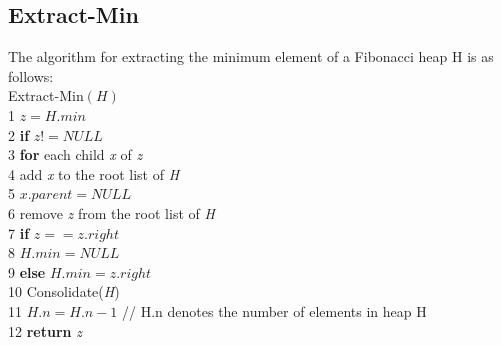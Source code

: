 \documentclass[12pt, a4paper]{article}
\begin{document}
	\subsection{Extract-Min}
	The algorithm for extracting the minimum element of a Fibonacci heap H is as follows: \\
	\large{Extract-Min$(H)$} \\
	1\-\hspace{0.5cm} $z = H.min$ \\
	2\-\hspace{0.5cm} \textbf{if} $z != NULL$\\
	3\-\hspace{0.5cm} \-\hspace{0.5cm} \textbf{for} each child \textit{x} of \textit{z} \\
	4\-\hspace{0.5cm} \-\hspace{0.5cm} \-\hspace{0.5cm} add \textit{x} to the root list of \textit{H} \\
	5\-\hspace{0.5cm} \-\hspace{0.5cm} \-\hspace{0.5cm} $x.parent = NULL$ \\
	6\-\hspace{0.5cm} \-\hspace{0.5cm} remove \textit{z} from the root list of \textit{H}\\
	7\-\hspace{0.5cm} \-\hspace{0.5cm} \textbf{if} $z == z.right$ \\
	8\-\hspace{0.5cm} \-\hspace{0.5cm} \-\hspace{0.5cm} $H.min = NULL$\\
	9\-\hspace{0.5cm} \-\hspace{0.5cm} \textbf{else} $H.min = z.right$ \\
	10\-\hspace{0.5cm} \-\hspace{0.5cm} \-\hspace{0.5cm} Consolidate(\textit{H}) \\
	11\-\hspace{0.5cm} \-\hspace{0.5cm} $H.n = H.n - 1$ // H.n denotes the number of elements in heap H \\
	12\-\hspace{0.5cm} \textbf{return} \textit{z} \\
	\newline
	
\end{document}
